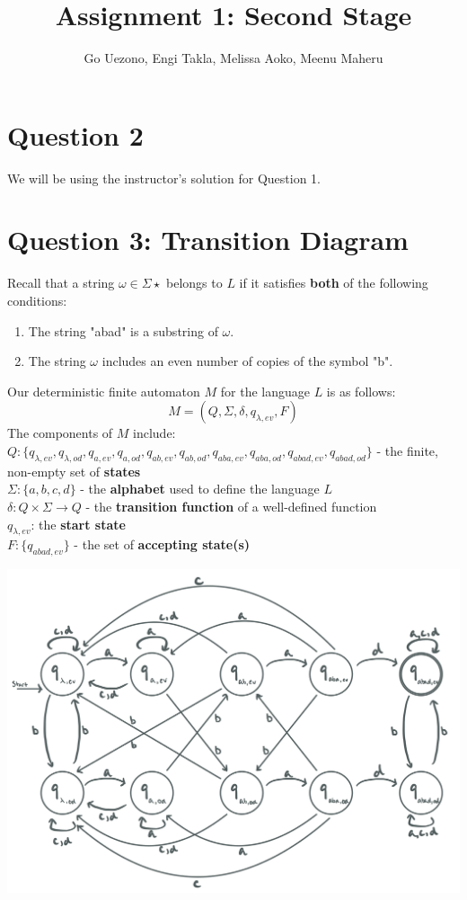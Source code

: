 \documentclass{article}
\title{Assignment 1: Second Stage}
\author{Go Uezono, Engi Takla, Melissa Aoko, Meenu Maheru}
\begin{document}
\maketitle

\section*{Question 2}
We will be using the instructor's solution for Question 1.

\section*{Question 3: Transition Diagram}
Recall that a string $\omega\in\Sigma\star$ belongs to $L$ if it satisfies \textbf{both} of the following conditions:
\begin{enumerate}
    \item The string "abad" is a substring of $\omega$.
    \item The string $\omega$ includes an even number of copies of the symbol "b".
\end{enumerate}
\noindent
Our deterministic finite automaton $M$ for the language $L$ is as follows: $$M=(Q,\Sigma,\delta,q_{\lambda,ev},F)$$ The components of $M$ include: \\
$Q: \{q_{\lambda,ev},q_{\lambda,od},q_{a,ev},q_{a,od},q_{ab,ev},q_{ab,od},q_{aba,ev},q_{aba,od},q_{abad,ev},q_{abad,od}\}$ - the finite, non-empty set of \textbf{states} \\
$\Sigma: \{a,b,c,d\}$ - the \textbf{alphabet} used to define the language $L$ \\
$\delta: Q \times \Sigma \rightarrow Q$ - the \textbf{transition function} of a well-defined function \\
$q_{\lambda,ev}$: the \textbf{start state} \\
$F: \{q_{abad,ev}\}$ - the set of \textbf{accepting state(s)}

\begin{center}
    \includegraphics[width=\textwidth]{dfadiagram.png}
\end{center}
\end{document}
